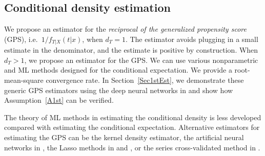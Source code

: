 \documentclass[lettersize, 12pt]{article}
\begin{document}
\subsection{Conditional density estimation}
\label{SecGPS}
We propose an estimator for the {\it reciprocal of the generalized propensity score} (GPS), i.e.\  $1/f_{T|X}(t|x)$, when $d_T = 1$.
The estimator avoids plugging in a small estimate in the denominator, and the estimate is positive by construction.
When $d_T > 1$, we propose an estimator for the GPS.
We can use various nonparametric and ML methods designed for the conditional expectation.
We provide a root-mean-square convergence rate.
In Section~\ref{Sec1stEst}, we demonstrate these generic GPS estimators using the deep neural networks in \cite{Farrell18} and show how Assumption~\ref{A1st} can be verified. 

The theory of ML methods in estimating the conditional density is less developed compared with estimating the conditional expectation.
Alternative estimators for estimating the GPS can be the kernel density estimator, the artificial neural networks in \cite{ChenWhite}, the Lasso methods in \cite{SUZ} and \cite{BCK19JASA}, or the series cross-validated method in \cite{Zhang}.
\end{document}

